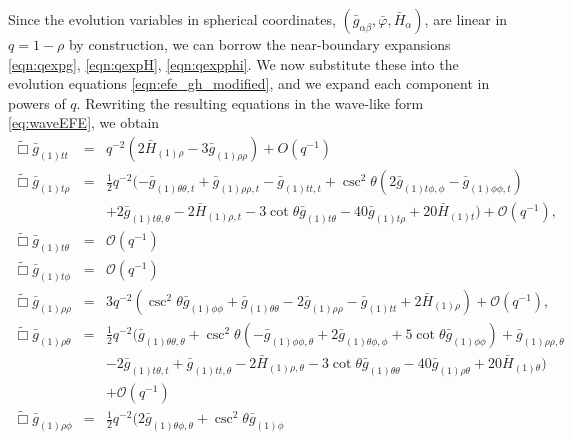 \documentclass[a4paper,11pt]{article}
\numberwithin{equation}{section}
\begin{document}
Since the evolution variables in spherical coordinates, $(\bar{g}_{\alpha\beta},\bar{\varphi},\bar{H}_\alpha)$, are linear in $q=1-\rho$ by construction, we can borrow the near-boundary expansions \eqref{eqn:qexpg}, \eqref{eqn:qexpH}, \eqref{eqn:qexpphi}. 
We now substitute these into the evolution equations \eqref{eqn:efe_gh_modified}, and we expand each component in powers of $q$. Rewriting the resulting equations in the wave-like form \eqref{eq:waveEFE}, we obtain
\begin{eqnarray}\label{eqn:efett_3p1}
\tilde{\Box}\bar{g}_{(1)tt}&=&q^{-2} \left(2 \bar{H}_{(1) \rho }-3 \bar{g}_{(1) \rho \rho }\right)+O\left(q^{-1}\right)\\
%
\label{eqn:efetrho_3p1}
\tilde{\Box}\bar{g}_{(1)t\rho}&=&\frac{1}{2}q^{-2} (-\bar{g}_{(1)\theta \theta,t}+\bar{g}_{(1) \rho \rho ,t}-\bar{g}_{(1)
   \text{$tt$},t}+\csc ^2\theta \left(2 \bar{g}_{(1) \text{$t$$\phi $},\phi }-\bar{g}_{(1)
   \phi \phi ,t}\right) \nonumber\\
   &&+2 \bar{g}_{(1) \text{$t$$\theta $},\theta }-2 \bar{H}_{(1) \rho ,t}-3
   \cot \theta  \bar{g}_{(1) \text{$t$$\theta $}}-40 \bar{g}_{(1) \text{$t$$\rho $}}+20
   \bar{H}_{(1) t}) +\mathcal{O}(q^{-1}),\\
%
\label{eqn:efettheta_3p1}
\tilde{\Box}\bar{g}_{(1)t\theta}&=&\mathcal{O}(q^{-1})\\
%
\label{eqn:efetphi_3p1}
\tilde{\Box}\bar{g}_{(1)t\phi}&=&\mathcal{O}(q^{-1})\\
%
\label{eqn:eferhorho_3p1}
\tilde{\Box}\bar{g}_{(1)\rho\rho}&=&3q^{-2} \left(\csc ^2\theta \bar{g}_{(1) \phi \phi }+\bar{g}_{(1)\theta \theta}-2 \bar{g}_{(1)
   \rho \rho }-\bar{g}_{(1) \text{$tt$}}+2 \bar{H}_{(1) \rho }\right)+\mathcal{O}(q^{-1}),\\
% 
\label{eqn:eferhotheta_3p1}
\tilde{\Box}\bar{g}_{(1)\rho\theta}&=&\frac{1}{2} q^{-2}(\bar{g}_{(1)\theta \theta,\theta }+\csc ^2\theta \left(-\bar{g}_{(1)
   \phi \phi ,\theta }+2 \bar{g}_{(1)\theta \phi,\phi }+5 \cot \theta  \bar{g}_{(1) \phi
   \phi }\right)+\bar{g}_{(1) \rho \rho ,\theta }\nonumber\\
   &&-2 \bar{g}_{(1) \text{$t$$\theta
   $},t}+\bar{g}_{(1) \text{$tt$},\theta }-2 \bar{H}_{(1) \rho ,\theta }-3 \cot \theta 
   \bar{g}_{(1)\theta \theta}-40 \bar{g}_{(1) \rho \theta }+20 \bar{H}_{(1)\theta})\nonumber\\
   &&+\mathcal{O}(q^{-1})\\
% 
\label{eqn:eferhophi_3p1}
\tilde{\Box}\bar{g}_{(1)\rho\phi}&=&\frac{1}{2} q^{-2}(2 \bar{g}_{(1)\theta \phi,\theta }+\csc ^2\theta \bar{g}_{(1) \phi
}
\end{eqnarray}
\end{document}
